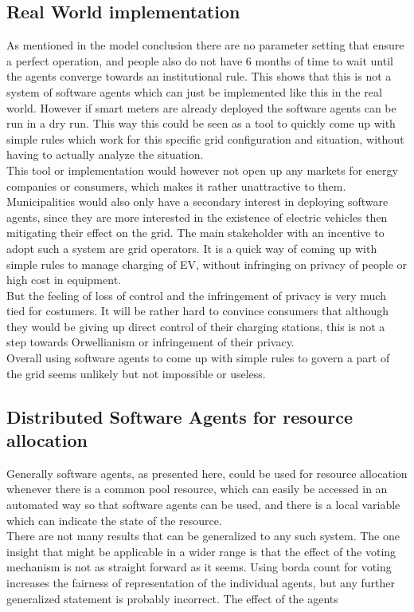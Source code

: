\documentclass[a4paper]{article}
\begin{document}
\subsection{Real World implementation}
As mentioned in the model conclusion there are no parameter setting that ensure a perfect operation, and people also do not have 6 months
of time to wait until the agents converge towards an institutional rule. This shows that this is not a system of software agents which 
can just be implemented like this in the real world. However if smart meters are already deployed the software agents can be run in a dry 
run. This way this could be seen as a tool to quickly come up with simple rules which work for this specific grid configuration and 
situation, without having to actually analyze the situation. \\
This tool or implementation would however not open up any markets for energy companies or consumers, which makes it rather unattractive 
to them. Municipalities would also only have a secondary interest in deploying software agents, since they are more interested in the 
existence of electric vehicles then mitigating their effect on the grid. The main stakeholder with an incentive to adopt such a system 
are grid operators. It is a quick way of coming up with simple rules to manage charging of EV, without infringing on privacy of people
or high cost in equipment. \\
But the feeling of loss of control and the infringement of privacy is very much tied for costumers. It will be rather hard to convince 
consumers that although they would be giving up direct control of their charging stations, this is not a step towards Orwellianism or 
infringement of their privacy. \\
Overall using software agents to come up with simple rules to govern a part of the grid seems unlikely but not impossible or useless.
\subsection{Distributed Software Agents for resource allocation}
Generally software agents, as presented here, could be used for resource allocation whenever there is a common pool resource, which can 
easily be accessed in an automated way so that software agents can be used, and there is a local
variable which can indicate the state of the resource. \\
There are not many results that can be generalized to any such system. The one insight that might be applicable in a wider range is 
that the effect of the voting mechanism is not as straight forward as it seems. Using borda count for voting increases the 
fairness of representation of the individual agents, but any further generalized statement is probably incorrect. The effect of the 
agents 
\end{document}
